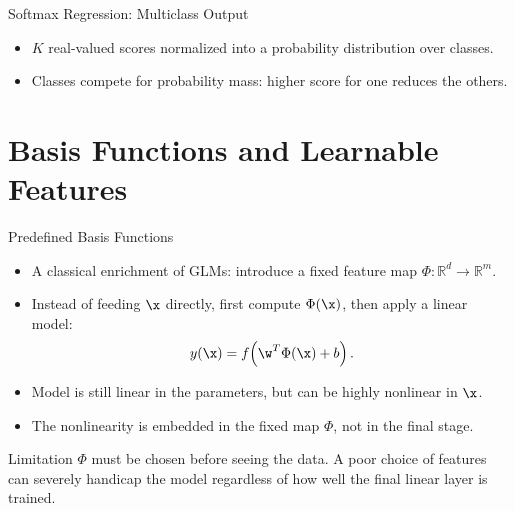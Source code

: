 \begin{frame}{Softmax Regression: Multiclass Output}
\begin{center}
  \end{center}
  \begin{itemize}
    \item $K$ real-valued scores normalized into a \alert{probability distribution} over classes.
    \item Classes compete for probability mass: higher score for one reduces the others.
  \end{itemize}
\end{frame}

\section{Basis Functions and Learnable Features}

\begin{frame}{Predefined Basis Functions}
  \begin{itemize}
    \item A classical enrichment of GLMs: introduce a \alert{fixed feature map} $\Phi\colon\mathbb{R}^d\to\mathbb{R}^m$.
    \item Instead of feeding $\x$ directly, first compute $\Phi(\x)$, then apply a linear model:
    \[
      y(\x) = f\!\left(\w^T\Phi(\x)+b\right).
    \]
    \item Model is still \alert{linear in the parameters}, but can be highly nonlinear in $\x$.
    \item The nonlinearity is embedded in the fixed map $\Phi$, not in the final stage.
  \end{itemize}
  \begin{alertblock}{Limitation}
    $\Phi$ must be chosen \alert{before seeing the data}. A poor choice of features can severely
    handicap the model regardless of how well the final linear layer is trained.
  \end{alertblock}
\end{frame}

